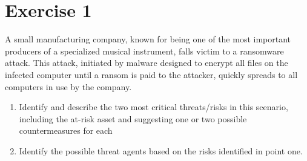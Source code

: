 \section{Exercise 1}

A small manufacturing company, known for being one of the most important producers of a specialized musical instrument, falls victim to a ransomware attack. 
This attack, initiated by malware designed to encrypt all files on the infected computer until a ransom is paid to the attacker, quickly spreads to all computers in use by the company.
\begin{enumerate}
    \item Identify and describe the two most critical threats/risks in this scenario, including the at-risk asset and suggesting one or two possible countermeasures for each
    \item Identify the possible threat agents based on the risks identified in point one.
\end{enumerate}

